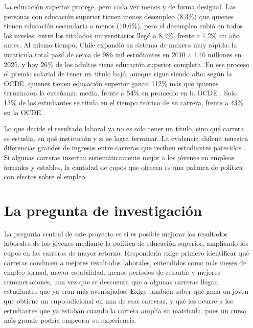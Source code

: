 \documentclass[11pt,a4paper]{article}
\begin{document}
La educación superior protege, pero cada vez menos y de forma desigual. Las personas con educación superior tienen menos desempleo (8,3\%) que quienes tienen educación secundaria o menos (10,6\%), pero el desempleo subió en todos los niveles; entre los titulados universitarios llegó a 8,4\%, frente a 7,2\% un año antes. Al mismo tiempo, Chile expandió su sistema de manera muy rápida: la matrícula total pasó de cerca de 986 mil estudiantes en 2010 a 1,46 millones en 2025, y hoy 26\% de los adultos tiene educación superior completa. En ese proceso el premio salarial de tener un título bajó, aunque sigue siendo alto: según la OCDE, quienes tienen educación superior ganan 112\% más que quienes terminaron la enseñanza media, frente a 54\% en promedio en la OCDE \citep{oecd2025}. Solo 13\% de los estudiantes se titula en el tiempo teórico de su carrera, frente a 43\% en la OCDE \citep{oecd2025}.

Lo que decide el resultado laboral ya no es solo tener un título, sino qué carrera se estudia, en qué institución y si se logra terminar. La evidencia chilena muestra diferencias grandes de ingresos entre carreras que reciben estudiantes parecidos \citep{hastings2013,rodriguez2016}. Si algunas carreras insertan sistemáticamente mejor a los jóvenes en empleos formales y estables, la cantidad de cupos que ofrecen es una palanca de política con efectos sobre el empleo.

\section{La pregunta de investigación}

La pregunta central de este proyecto es si es posible mejorar los resultados laborales de los jóvenes mediante la política de educación superior, ampliando los cupos en las carreras de mayor retorno. Responderla exige primero identificar qué carreras conducen a mejores resultados laborales, entendidos como más meses de empleo formal, mayor estabilidad, menos períodos de cesantía y mejores remuneraciones, una vez que se descuenta que a algunas carreras llegan estudiantes que ya eran más aventajados. Exige también saber qué gana un joven que obtiene un cupo adicional en una de esas carreras, y qué les ocurre a los estudiantes que ya estaban cuando la carrera amplía su matrícula, pues un curso más grande podría empeorar su experiencia.
\end{document}
